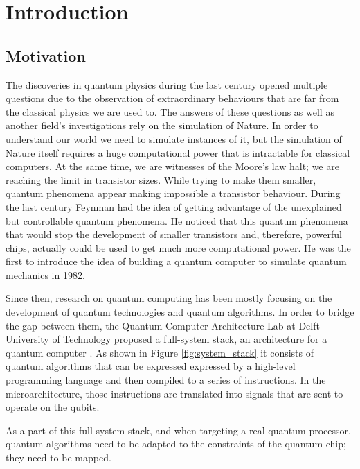 
\chapter{Introduction}
\label{sec:org76eb342}
\section{Motivation}
\label{sec:org37e5d53}
The discoveries in quantum physics during the last century opened multiple questions due to the observation of extraordinary behaviours that are far from the classical physics we are used to.
The answers of these questions as well as another field's investigations rely on the simulation of Nature.
In order to understand our world we need to simulate instances of it, but the simulation of Nature itself requires a huge computational power that is intractable for classical computers.
At the same time, we are witnesses of the Moore's law halt; we are reaching the limit in transistor sizes.
While trying to make them smaller, quantum phenomena appear making impossible a transistor behaviour.
During the last century Feynman had the idea of getting advantage of the unexplained but controllable quantum phenomena.
He noticed that this quantum phenomena that would stop the development of smaller transistors and, therefore, powerful chips, actually could be used to get much more computational power. He was the first to introduce the idea of building a quantum computer to simulate quantum mechanics in 1982.


Since then, research on quantum computing has been mostly focusing on the development of quantum technologies and quantum algorithms. In order to bridge the gap between them, the Quantum Computer Architecture Lab at Delft University of Technology proposed a full-system stack, an architecture for a quantum computer \cite{Fu_2016}. As shown in Figure  \ref{fig:system_stack} it consists of quantum algorithms that can be expressed expressed by a high-level programming language and then compiled to a series of instructions. In the microarchitecture, those instructions are translated into signals that are sent to operate on the qubits.  



As a part of this full-system stack, and when targeting a real quantum processor,  quantum algorithms need to be adapted to the constraints  of the quantum chip; they need to be mapped.


